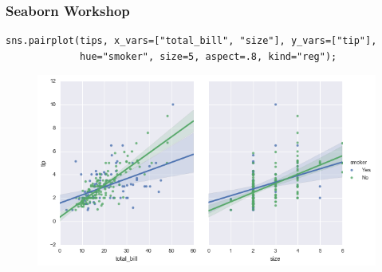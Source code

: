 \documentclass{beamer}
\begin{document}
\begin{frame}[fragile]
	\frametitle{Seaborn Workshop}
	\begin{verbatim}
sns.pairplot(tips, x_vars=["total_bill", "size"], y_vars=["tip"],
             hue="smoker", size=5, aspect=.8, kind="reg");

\end{verbatim}
\begin{figure}
	\centering
	\includegraphics[width=0.8\linewidth]{images/regression_55_0}
\end{figure}
\end{frame}
\end{document}
